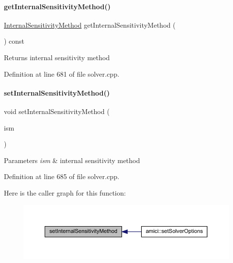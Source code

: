 \paragraph{\texorpdfstring{get\+Internal\+Sensitivity\+Method()}{getInternalSensitivityMethod()}}
{\footnotesize\ttfamily \mbox{\hyperlink{namespaceamici_aa444c52f0a5638d68702d1ec92f8db87}{Internal\+Sensitivity\+Method}} get\+Internal\+Sensitivity\+Method (\begin{DoxyParamCaption}{ }\end{DoxyParamCaption}) const}

\begin{DoxyReturn}{Returns}
internal sensitivity method 
\end{DoxyReturn}


Definition at line 681 of file solver.\+cpp.

\mbox{\label{classamici_1_1_solver_ab114a079f23232a521ad2e81a0a30e36}} 
\paragraph{\texorpdfstring{set\+Internal\+Sensitivity\+Method()}{setInternalSensitivityMethod()}}
{\footnotesize\ttfamily void set\+Internal\+Sensitivity\+Method (\begin{DoxyParamCaption}\item[{\mbox{\hyperlink{namespaceamici_aa444c52f0a5638d68702d1ec92f8db87}{Internal\+Sensitivity\+Method}}}]{ism }\end{DoxyParamCaption})}


\begin{DoxyParams}{Parameters}
{\em ism} & internal sensitivity method \\
\hline
\end{DoxyParams}


Definition at line 685 of file solver.\+cpp.

Here is the caller graph for this function\+:
\nopagebreak
\begin{figure}[H]
\begin{center}
\leavevmode
\includegraphics[width=350pt]{classamici_1_1_solver_ab114a079f23232a521ad2e81a0a30e36_icgraph}
\end{center}
\end{figure}
\mbox{\label{classamici_1_1_solver_a566d267fa2815fe0dd3c29d44f68209b}} 
